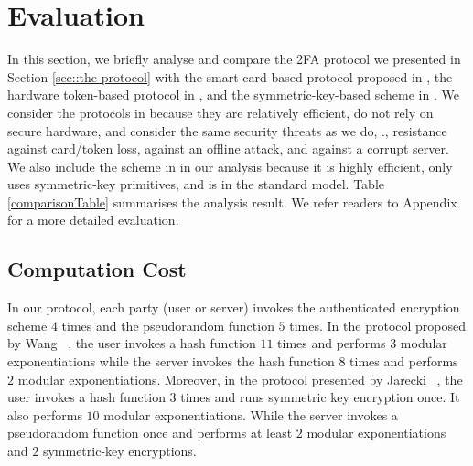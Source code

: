 
\section{Evaluation}\label{sec:eval}




In this section, we briefly analyse and compare the 2FA protocol we presented in Section \ref{sec::the-protocol} with the smart-card-based protocol proposed in  \cite{WangW18}, the hardware token-based protocol in \cite{JareckiJKSS21}, and the symmetric-key-based scheme in  \cite{MatsuoMY11}.  We consider the protocols in  \cite{WangW18,JareckiJKSS21} because they are relatively efficient, do not rely on secure hardware, and consider the same security threats as we do, \ie., resistance against card/token loss, against an offline attack, and against a corrupt server. We also include the scheme in  \cite{MatsuoMY11}  in our analysis because it is highly efficient, only uses symmetric-key primitives, and is in the standard model. Table \ref{comparisonTable} summarises the analysis result. We refer readers to Appendix   for a more detailed evaluation. 





\subsection{Computation Cost}
\vspace{-.3mm}


In our protocol, each party (user or server) invokes the authenticated encryption scheme $4$ times and the pseudorandom function $5$ times. In the protocol proposed by Wang \etal~\cite{WangW18}, the user invokes a hash function $11$ times and performs $3$ modular exponentiations while the server invokes the hash function $8$ times and performs $2$ modular exponentiations. Moreover, in the protocol presented by Jarecki \etal~\cite{JareckiJKSS21}, the user invokes a hash function $3$ times and runs symmetric key encryption once. It also performs $10$ modular exponentiations. While the server invokes a pseudorandom function once and performs at least $2$ modular exponentiations and $2$ symmetric-key encryptions. 


